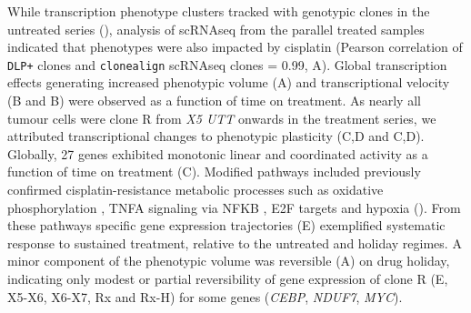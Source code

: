 
 


While transcription phenotype clusters tracked with genotypic clones in the untreated series (), analysis of scRNAseq from the parallel treated samples indicated that phenotypes were also impacted by cisplatin (Pearson correlation of \texttt{DLP+} clones and \texttt{clonealign} scRNAseq clones = 0.99, A). Global transcription effects generating increased phenotypic volume\cite{Azizi2018-eb} (A) and transcriptional velocity\cite{La_Manno2018-az} (B and B) were observed as a function of time on treatment.  As nearly all tumour cells were clone R from \textit{X5 UTT} onwards in the treatment series, we attributed transcriptional changes to phenotypic plasticity (C,D and C,D). Globally,  27 genes exhibited monotonic linear and coordinated activity as a function of time on treatment (C).
Modified pathways included previously confirmed cisplatin-resistance metabolic processes such as oxidative phosphorylation \cite{lee2017myc}, TNFA signaling via NFKB \cite{lagunas2008nuclear,ito2015down,ryan2019targeting}, E2F targets \cite{zheng2020upregulation} and hypoxia \cite{lee2012hypoxia,mcevoy2015identifying,deben2018hypoxia,li2019erk} (). From these pathways specific gene expression trajectories (E) exemplified systematic response to sustained treatment, relative to the untreated and holiday regimes. A minor component of the phenotypic volume was reversible (A) on drug holiday, indicating only modest or partial reversibility of gene expression of clone R (E, X5-X6, X6-X7, Rx and Rx-H) for some genes (\textit{CEBP}, \textit{NDUF7}, \textit{MYC}).


